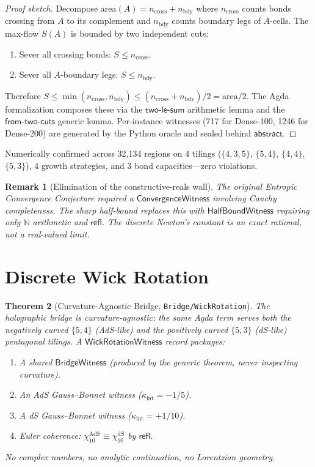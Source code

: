 \documentclass[11pt,a4paper]{article}
\newtheorem{theorem}{Theorem}[section]
\newtheorem{remark}[theorem]{Remark}
\newcommand{\N}{\mathbb{N}}
\newcommand{\refl}{\mathsf{refl}}
\newcommand{\module}[1]{\texttt{#1}}
\begin{document}
\begin{proof}[Proof sketch]
Decompose $\mathrm{area}(A) = n_{\mathrm{cross}} + n_{\mathrm{bdy}}$
where $n_{\mathrm{cross}}$ counts bonds crossing from $A$ to its
complement and $n_{\mathrm{bdy}}$ counts boundary legs of $A$-cells.
The max-flow $S(A)$ is bounded by two independent cuts:
\begin{enumerate}[nosep]
\item Sever all crossing bonds: $S \leq n_{\mathrm{cross}}$.
\item Sever all $A$-boundary legs: $S \leq n_{\mathrm{bdy}}$.
\end{enumerate}
Therefore
$S \leq \min(n_{\mathrm{cross}}, n_{\mathrm{bdy}})
\leq (n_{\mathrm{cross}} + n_{\mathrm{bdy}})/2
= \mathrm{area}/2$.
The Agda formalization composes these via the
$\mathsf{two\text{-}le\text{-}sum}$ arithmetic lemma and the
$\mathsf{from\text{-}two\text{-}cuts}$ generic lemma.
Per-instance witnesses (717 for Dense-100, 1246 for Dense-200) are
generated by the Python oracle and sealed behind
$\mathsf{abstract}$.
\end{proof}

Numerically confirmed across 32,134 regions on 4 tilings
($\{4,3,5\}$, $\{5,4\}$, $\{4,4\}$, $\{5,3\}$), 4 growth
strategies, and 3 bond capacities---zero violations.

\begin{remark}[Elimination of the constructive-reals wall]
The original \emph{Entropic Convergence Conjecture} required a
$\mathsf{ConvergenceWitness}$ involving Cauchy completeness.
The sharp half-bound replaces this with
$\mathsf{HalfBoundWitness}$ requiring only $\N$ arithmetic and
$\refl$.  The discrete Newton's constant is an exact rational,
not a real-valued limit.
\end{remark}

\section{Discrete Wick Rotation}
\label{sec:wick}

\begin{theorem}[Curvature-Agnostic Bridge,
    \module{Bridge/WickRotation}]
\label{thm:wick}
The holographic bridge is curvature-agnostic: the same Agda term
serves both the negatively curved $\{5,4\}$ (AdS-like) and the
positively curved $\{5,3\}$ (dS-like) pentagonal tilings.  A
$\mathsf{WickRotationWitness}$ record packages:
\begin{enumerate}[nosep]
\item A shared $\mathsf{BridgeWitness}$ (produced by the generic
  theorem, never inspecting curvature).
\item An AdS Gauss--Bonnet witness ($\kappa_{\mathrm{int}} = -1/5$).
\item A dS Gauss--Bonnet witness ($\kappa_{\mathrm{int}} = +1/10$).
\item Euler coherence: $\chi_{10}^{\mathrm{AdS}} \equiv
  \chi_{10}^{\mathrm{dS}}$ by $\refl$.
\end{enumerate}
No complex numbers, no analytic continuation, no Lorentzian geometry.
\end{theorem}
\end{document}
